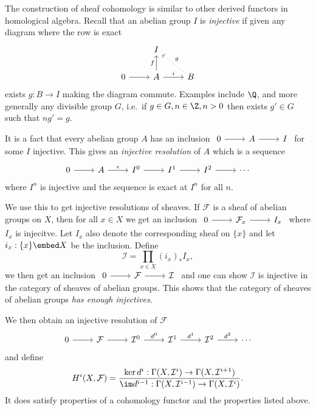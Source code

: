 \documentclass[a4paper]{article}
\newcommand{\sh}[1]{\mathcal{#1}} %
\begin{document}
The construction of sheaf cohomology is similar to other derived functors in homological algebra. Recall that an abelian group \(I\) is \emph{injective} if given any diagram where the row is exact
\[
  \begin{tikzcd}
    & I \\
    0 \ar[r] & A \ar[r, "i"] \ar[u, "f"] & B \ar[ul, dotted, "g"']
  \end{tikzcd}
\]
exists \(g: B \to I\) making the diagram commute. Examples include \(\Q\), and more generally any divisible group \(G\), i.e.\ if \(g \in G, n \in \Z, n > 0\) then exists \(g' \in G\) such that \(ng' = g\).

It is a fact that every abelian group \(A\) has an inclusion \(
\begin{tikzcd}
  0 \ar[r] & A \ar[r] & I
\end{tikzcd}
\) for some \(I\) injective. This gives an \emph{injective resolution} of \(A\) which is a sequence
\[
  \begin{tikzcd}
    0 \ar[r] & A \ar[r, "\epsilon"] & I^0 \ar[r] & I^1 \ar[r] & I^2 \ar[r] & \cdots
  \end{tikzcd}
\]
where \(I^n\) is injective and the sequence is exact at \(I^n\) for all \(n\).

We use this to get injective resolutions of sheaves. If \(\sh F\) is a sheaf of abelian groups on \(X\), then for all \(x \in X\) we get an inclusion \(
\begin{tikzcd}
  0 \ar[r] & \sh F_x \ar[r] & I_x
\end{tikzcd}
\) where \(I_x\) is injecitve. Let \(I_x\) also denote the corresponding sheaf on \(\{x\}\) and let \(i_x: \{x\} \embed X\) be the inclusion. Define
\[
  \sh I = \prod_{x \in X} (i_x)_* I_x,
\]
we then get an inclusion \(
\begin{tikzcd}
  0 \ar[r] & \sh F \ar[r] & \sh I
\end{tikzcd}
\) and one can show \(\sh I\) is injective in the category of sheaves of abelian groups. This shows that the category of sheaves of abelian groups \emph{has enough injectives}.

We then obtain an injective resolution of \(\sh F\)
\[
  \begin{tikzcd}
    0 \ar[r] & \sh F \ar[r] & \sh I^0 \ar[r, "d^0"] & \sh I^1 \ar[r, "d^1"] & \sh I^2 \ar[r, "d^2"] & \cdots
  \end{tikzcd}
\]
and define
\[
  H^i(X, \sh F) = \frac{\ker d^i: \Gamma(X, \sh I^i) \to \Gamma(X, \sh I^{i + 1})}{\im d^{i - 1}: \Gamma(X, \sh I^{i - 1}) \to \Gamma(X, \sh I^i)}.
\]
It does satisfy properties of a cohomology functor and the properties listed above.
\end{document}
